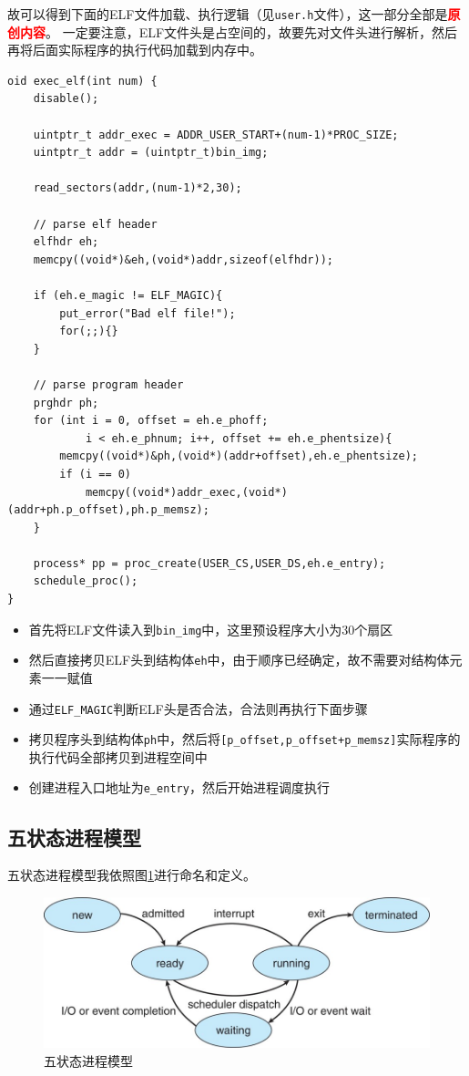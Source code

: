 \documentclass[logo,reportComp]{thesis}
\begin{document}
故可以得到下面的ELF文件加载、执行逻辑（见\verb'user.h'文件），这一部分全部是\textcolor{red}{\textbf{原创内容}}。
一定要注意，ELF文件头是占空间的，故要先对文件头进行解析，然后再将后面实际程序的执行代码加载到内存中。
\begin{lstlisting}
oid exec_elf(int num) {
	disable();

	uintptr_t addr_exec = ADDR_USER_START+(num-1)*PROC_SIZE;
	uintptr_t addr = (uintptr_t)bin_img;

	read_sectors(addr,(num-1)*2,30);

	// parse elf header
	elfhdr eh;
	memcpy((void*)&eh,(void*)addr,sizeof(elfhdr));

	if (eh.e_magic != ELF_MAGIC){
		put_error("Bad elf file!");
		for(;;){}
	}

	// parse program header
	prghdr ph;
	for (int i = 0, offset = eh.e_phoff;
			i < eh.e_phnum; i++, offset += eh.e_phentsize){
		memcpy((void*)&ph,(void*)(addr+offset),eh.e_phentsize);
		if (i == 0)
			memcpy((void*)addr_exec,(void*)(addr+ph.p_offset),ph.p_memsz);
	}

	process* pp = proc_create(USER_CS,USER_DS,eh.e_entry);
	schedule_proc();
}
\end{lstlisting}
\begin{itemize}
	\item 首先将ELF文件读入到\verb'bin_img'中，这里预设程序大小为30个扇区
	\item 然后直接拷贝ELF头到结构体\verb'eh'中，由于顺序已经确定，故不需要对结构体元素一一赋值
	\item 通过\verb'ELF_MAGIC'判断ELF头是否合法，合法则再执行下面步骤
	\item 拷贝程序头到结构体\verb'ph'中，然后将\verb'[p_offset,p_offset+p_memsz]'实际程序的执行代码全部拷贝到进程空间中
	\item 创建进程入口地址为\verb'e_entry'，然后开始进程调度执行
\end{itemize}

\subsection{五状态进程模型}
五状态进程模型我依照图\ref{fig:five-state}进行命名和定义。
\begin{figure}[H]
\centering
\includegraphics[width=0.5\linewidth]{fig/five-state.jpg}
\caption{五状态进程模型}
\label{fig:five-state}
\end{figure}
\end{document}
